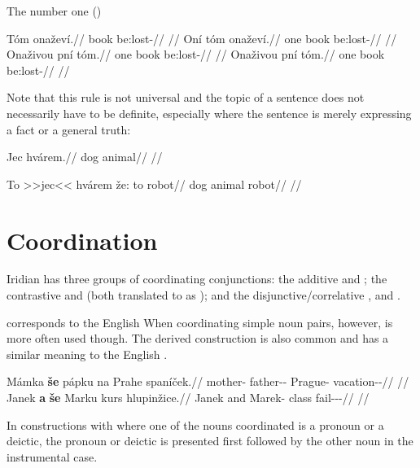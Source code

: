 The number one ()

\pex
\a
\begingl
\gla Tóm onaževí.//
\glb book be:lost-//
\glft {}//
\endgl
\a
\begingl
\gla Oní tóm onaževí.//
\glb one book be:lost-//
\glft {}//
\endgl
\a
\begingl
\gla Onaživou pní tóm.//
\glb one book be:lost-//
\glft {}//
\endgl
\a
\begingl
\gla Onaživou pní tóm.//
\glb one book be:lost-//
\glft {}//
\endgl
\xe


Note that this rule is not universal and the topic of a sentence does not necessarily have to be definite, especially where the sentence is merely expressing a fact or a general truth:

\pex
\begingl
\gla Jec hvárem.//
\glb dog animal//
\glft {}//
\endgl
\xe



\pex
\begingl
\gla To >>jec<< hvárem že: to robot//
\glb \Dem{} dog animal  \Dem{} robot//
\glft {}//
\endgl
\xe

\section{Coordination} 

Iridian has three groups of coordinating conjunctions: the additive  and ;
the contrastive  and  (both translated to  as ); and
the disjunctive/correlative ,  and .

 corresponds to the English  When coordinating simple noun pairs, however,  is more often used though. The derived construction  is also common and has a similar meaning to the English .

\pex
\begingl
    \gla Mámka \textbf{še} pápku na Prahe spaníček.//
    \glb mother-\Dim{} \Com{} father-\Dim{}-\Ins{} \Loc{} Prague-\Acc{} vacation-\Av{}-\Pf{}//
    \glft {}//
\endgl
\xe
\pex
\begingl
    \gla Janek \textbf{a} \textbf{še} Marku kurs hlupinžice.//
    \glb Janek and \Com{} Marek-\Ins{} class fail-\Av{}-\Pf{}-\Quot{}//
    \glft {}//
\endgl
\xe

In constructions with  where one of the nouns coordinated is a pronoun or a deictic, the pronoun or deictic is presented first followed by the other noun in the instrumental case.

